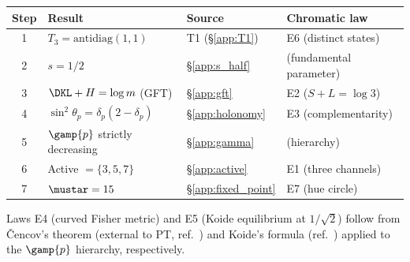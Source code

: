 \documentclass[12pt,a4paper]{article}
\begin{document}
\begin{center}
\small
\begin{tabular}{clll}
\toprule
\textbf{Step} & \textbf{Result} & \textbf{Source} & \textbf{Chromatic law} \\
\midrule
1 & $T_3 = \mathrm{antidiag}(1,1)$ & T1 (\S\ref{app:T1}) & E6 (distinct states) \\
2 & $s = 1/2$ & \S\ref{app:s_half} & (fundamental parameter) \\
3 & $\DKL + H = \log m$ (GFT) & \S\ref{app:gft} & E2 ($S + L = \log 3$) \\
4 & $\sin^2\!\theta_p = \delta_p(2-\delta_p)$ & \S\ref{app:holonomy} & E3 (complementarity) \\
5 & $\gamp{p}$ strictly decreasing & \S\ref{app:gamma} & (hierarchy) \\
6 & Active $= \{3,5,7\}$ & \S\ref{app:active} & E1 (three channels) \\
7 & $\mustar = 15$ & \S\ref{app:fixed_point} & E7 (hue circle) \\
\bottomrule
\end{tabular}
\end{center}

\noindent
Laws E4 (curved Fisher metric) and E5 (Koide equilibrium at
$1/\sqrt{2}$) follow from \v{C}encov's theorem (external to PT,
ref.~\cite{cencov1982}) and Koide's formula (ref.~\cite{koide1981})
applied to the $\gamp{p}$ hierarchy, respectively.
\end{document}
